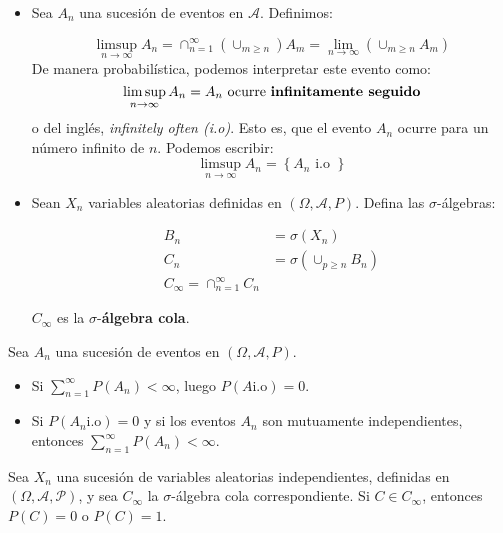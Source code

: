 \begin{boxDef}
	\begin{itemize}
		\item Sea $A_n$ una sucesión de eventos en $\mathcal{A}$. Definimos:

		\[
			\limsup_{n \rightarrow \infty } A_n = \cap_{n = 1}^{\infty} (\cup_{m \geq n}) A_m = \lim_{n \rightarrow \infty} (\cup_{m \geq n} A_m)
		\]
		De manera probabilística, podemos interpretar este evento como:
		\[
			\limsup_{n \rightarrow \infty} A_n = A_n \text{ ocurre \textbf{infinitamente seguido}}
		\]
		o del inglés, \textit{infinitely often (i.o)}. Esto es, que el evento $A_n$ ocurre para un número infinito de $n$. Podemos escribir:
		\[
			\limsup_{n \rightarrow \infty} A_n = \left\{ A_n \text{ i.o } \right\}
		\]

		\item Sean $X_n$ variables aleatorias definidas en $(\Omega, \mathcal{A}, P)$. Defina las $\sigma$-álgebras:

		\begin{align*}
			B_n &= \sigma(X_n)\\
			C_n &= \sigma(\cup_{p \geq n} B_n)\\
			C_{\infty} = \cap_{n=1}^{\infty} C_n
		\end{align*}

		$C_{\infty}$ es la $\sigma$-\textbf{álgebra cola}.

	\end{itemize}
\end{boxDef}


\begin{theorem}
	Sea $A_n$ una sucesión de eventos en $(\Omega, \mathcal{A}, P)$.

	\begin{itemize}
		\item Si $\sum_{n = 1}^{\infty} P(A_n) < \infty$, luego $P(A \text{i.o}) = 0$.
		\item Si $P(A_n \text{i.o}) = 0$ y si los eventos $A_n$ son mutuamente independientes, entonces $\sum_{n = 1}^{\infty} P(A_n) < \infty$. 
	\end{itemize}

\end{theorem}


\begin{theorem}
	Sea $X_n$ una sucesión de variables aleatorias independientes, definidas en $(\Omega, \mathcal{A, P})$, y sea $C_{\infty}$ la $\sigma$-álgebra cola correspondiente. Si $C \in C_{\infty}$, entonces $P(C) = 0$ o $P(C) = 1$.
\end{theorem}

